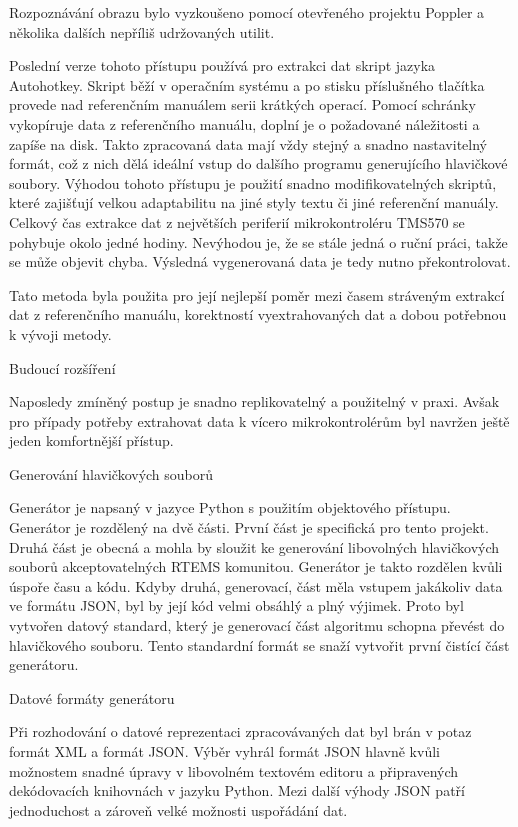 Rozpoznávání obrazu bylo vyzkoušeno pomocí otevřeného projektu Poppler a několika dalších nepříliš udržovaných utilit.

Poslední verze tohoto přístupu používá pro extrakci dat skript jazyka Autohotkey.
Skript běží v operačním systému a po stisku příslušného tlačítka provede nad referenčním manuálem serii krátkých operací.
Pomocí schránky vykopíruje data z referenčního manuálu, doplní je o požadované náležitosti a zapíše na disk.
Takto zpracovaná data mají vždy stejný a snadno nastavitelný formát, což z nich dělá ideální vstup do dalšího programu generujícího hlavičkové soubory.
Výhodou tohoto přístupu je použití snadno modifikovatelných skriptů, které zajišťují velkou adaptabilitu na jiné styly textu či jiné referenční manuály.
Celkový čas extrakce dat z největších periferií mikrokontroléru TMS570 se pohybuje okolo jedné hodiny.
Nevýhodou je, že se stále jedná o ruční práci, takže se může objevit chyba.
Výsledná vygenerovaná data je tedy nutno překontrolovat.

Tato metoda byla použita pro její nejlepší poměr mezi časem stráveným extrakcí dat z referenčního manuálu, korektností vyextrahovaných dat a dobou potřebnou k vývoji metody.

\secc Budoucí rozšíření

	Naposledy zmíněný postup je snadno replikovatelný a použitelný v praxi.
Avšak pro případy potřeby extrahovat data k vícero mikrokontrolérům byl navržen ještě jeden komfortnější přístup. %

\sec Generování hlavičkových souborů

	Generátor je napsaný v jazyce Python s použitím objektového přístupu.
Generátor je rozdělený na dvě části.
První část je specifická pro tento projekt.
Druhá část je obecná a mohla by sloužit ke generování libovolných hlavičkových souborů akceptovatelných RTEMS komunitou.
Generátor je takto rozdělen kvůli úspoře času a kódu.
Kdyby druhá, generovací, část měla vstupem jakákoliv data ve formátu JSON, byl by její kód velmi obsáhlý a plný výjimek.
Proto byl vytvořen datový standard, který je generovací část algoritmu schopna převést do hlavičkového souboru.
Tento standardní formát se snaží vytvořit první čistící část generátoru.

\secc Datové formáty generátoru

	Při rozhodování o datové reprezentaci zpracovávaných dat byl brán v potaz formát XML a formát JSON.
Výběr vyhrál formát JSON hlavně kvůli možnostem snadné úpravy v libovolném textovém editoru a připravených dekódovacích knihovnách v jazyku Python.
Mezi další výhody JSON patří jednoduchost a zároveň velké možnosti uspořádání dat. 

